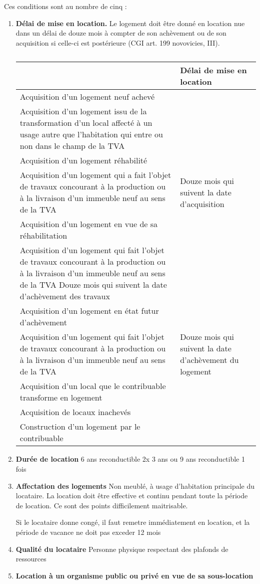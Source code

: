 				Ces conditions sont au nombre de cinq :
				\begin{enumerate}
					\item \textbf{Délai de mise en location.} Le logement doit être donné en location nue dans un délai de douze mois à compter de son achèvement ou de son acquisition si celle-ci est postérieure (CGI art. 199 novovicies, III).
					\begin{table}
						\centering
						\label{tab:}
						\begin{tabularx}{0,75\linewidth}{}
							\toprule
								& \textbf{Délai de mise en location} \\
							\midrule
								Acquisition d'un logement neuf achevé & \\
								Acquisition d'un logement issu de la transformation d'un local affecté à un usage autre que l'habitation qui entre ou non dans le champ de la TVA & \\
								Acquisition d'un logement réhabilité & \\
								Acquisition d'un logement qui a fait l'objet de travaux concourant à la production ou à la livraison d'un immeuble neuf au sens de la TVA & Douze mois qui suivent la date d'acquisition \\
								Acquisition d'un logement en vue de sa réhabilitation & \\
								Acquisition d'un logement qui fait l'objet de travaux concourant à la production ou à la livraison d'un immeuble neuf au sens de la TVA	Douze mois qui suivent la date d'achèvement des travaux & \\
								Acquisition d'un logement en état futur d'achèvement & \\
								Acquisition d'un logement qui fait l'objet de travaux concourant à la production ou à la livraison d'un immeuble neuf au sens de la TVA & Douze mois qui suivent la date d'achèvement du logement \\
								Acquisition d'un local que le contribuable transforme en logement	& \\
								Acquisition de locaux inachevés	& \\
								Construction d'un logement par le contribuable & \\
							\bottomrule
						\end{tabularx}
						\caption{}
					\end{table}
					\item \textbf{Durée de location} 6 ans reconductible 2x 3 ans ou 9 ans reconductible 1 fois
					\item \textbf{Affectation des logements} Non meublé, à usage d'habitation principale du locataire. La location doit être effective et continu pendant toute la période de location. Ce sont des points difficilement maitrisable.

					Si le locataire donne congé, il faut remetre immédiatement en location, et la période de vacance ne doit pas exceder 12 mois
					\item \textbf{Qualité du locataire} Personne physique respectant des plafonds de ressources
					\item \textbf{Location à un organisme public ou privé en vue de sa sous-location}
				\end{enumerate}


